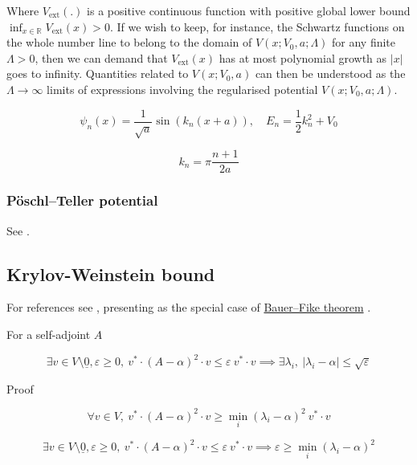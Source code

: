 \documentclass{article}
\theoremstyle{definition}
\begin{document}
Where $V_\text{ext}(.)$ is a positive continuous function with positive global lower bound $\inf_{x \in \mathbb{R}} V_\text{ext}(x) > 0$. If we wish to keep, for instance, the Schwartz functions on the whole number line to belong to the domain of $V(x;V_0,a;\Lambda)$ for any finite $\Lambda>0$, then we can demand that $V_\text{ext}(x)$ has at most polynomial growth as $|x|$ goes to infinity.
Quantities related to $V(x;V_0,a)$ can then be understood as the $\Lambda \to \infty$ limits of expressions involving the regularised potential $V(x;V_0,a;\Lambda)$.

\begin{equation}
    \psi_n(x)=\frac{1}{\sqrt{a}}\sin(k_n (x+a)), \quad
    E_n = \frac{1}{2} k_n^2 + V_0
\end{equation}

\begin{equation}
    k_n=\pi \frac{n+1}{2 a}
\end{equation}

\subsubsection{Pöschl–Teller potential}

See \cite{book:Flugge1999PracticalQuantumMechanics}.
\subsection{Krylov-Weinstein bound}

For references see \cite{TR:ZhuArgentatiKnyazev2013TR,paper:ZhuArgentatiKnyazev2013,book:Yosida1980,paper:Davies1998,paper:Nagatou2009}, presenting as the special case of \href{https://en.wikipedia.org/wiki/Bauer\%E2\%80\%93Fike\_theorem}{Bauer–Fike theorem} \cite{book:Saad2011}.

For a self-adjoint $A$

\begin{equation}
\exists v \in V \setminus {\underline{0}} , \varepsilon \ge 0 ,  \ v^* \cdot (A-\alpha)^2 \cdot v \le \varepsilon \ v^* \cdot v
\implies
\exists \lambda_i, \ |\lambda_i-\alpha| \le \sqrt{\varepsilon}
\end{equation}

Proof

\begin{equation}
\forall v \in V, \  v^* \cdot (A-\alpha)^2 \cdot v  \ge \min_{i} (\lambda_i-\alpha)^2 \ v^* \cdot v
\end{equation}

\begin{equation}
\exists v \in V \setminus {\underline{0}} , \varepsilon \ge 0 ,  \ v^* \cdot (A-\alpha)^2 \cdot v \le \varepsilon \ v^* \cdot v
\implies
\varepsilon \ge  \min_{i} (\lambda_i-\alpha)^2
\end{equation}
\end{document}
